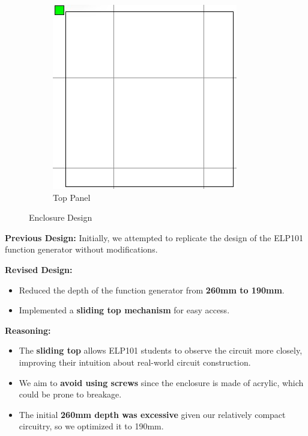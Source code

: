 \documentclass[12pt,a4paper]{article}
\begin{document}
\begin{figure}[H]
    \begin{subfigure}{0.48\textwidth} %
        \centering
        \includegraphics[width=\textwidth]{Design_Cycle_2.5.jpeg} %
        \caption{Top Panel}
        \label{fig:Top Panel}
    \end{subfigure}

    \caption{Enclosure Design}
    \label{fig:Enclosure Design}
\end{figure}
\newpage

\textbf{Previous Design:}  
Initially, we attempted to replicate the design of the ELP101 
 function generator without modifications.  

\textbf{Revised Design:}  
\begin{itemize}
    \item Reduced the depth of the function generator from \textbf{260mm to 190mm}.  
    \item Implemented a \textbf{sliding top mechanism} for easy access.  
\end{itemize}

\textbf{Reasoning:}  
\begin{itemize}
    \item The \textbf{sliding top} allows ELP101 students to observe the circuit more closely, improving their intuition about real-world circuit construction.  
    \item We aim to \textbf{avoid using screws} since the enclosure is made of acrylic, which could be prone to breakage.  
    \item The initial \textbf{260mm depth was excessive} given our relatively compact circuitry, so we optimized it to 190mm.  
\end{itemize}
\end{document}
